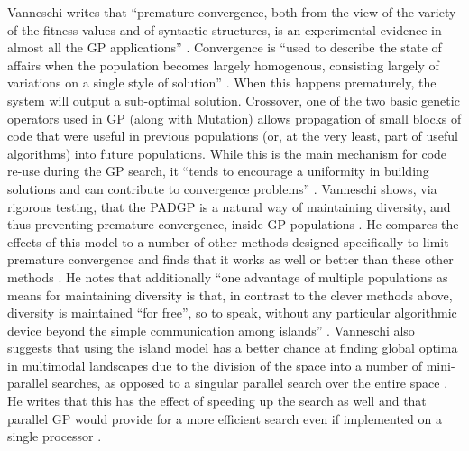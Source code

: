 \documentclass[a4paper,12pt]{report} 	%
\numberwithin{figure}{chapter}
\numberwithin{table}{chapter}
\numberwithin{equation}{chapter}
\begin{document}
\begin{flushleft}
Vanneschi writes that ``premature convergence, both from the view of the variety of the fitness values and of syntactic structures, is an experimental evidence in almost all the GP applications'' \cite[p. 15]{Vanneschi:2004le}. Convergence is ``used to describe the state of affairs when the population becomes largely homogenous, consisting largely of variations on a single style of solution'' \cite[p. 26]{Vanneschi:2004le}. When this happens prematurely, the system will output a sub-optimal solution. Crossover, one of the two basic genetic operators used in GP (along with Mutation) allows propagation of small blocks of code that were useful in previous populations (or, at the very least, part of useful algorithms) into future populations. While this is the main mechanism for code re-use during the GP search, it ``tends to encourage a uniformity in building solutions and can contribute to convergence problems'' \cite[p. 30]{Wehn:1998bh}. Vanneschi shows, via rigorous testing, that the PADGP is a natural way of maintaining diversity, and thus preventing premature convergence, inside GP populations \cite[p. 213]{Vanneschi:2004le}. He compares the effects of this model to a number of other methods designed specifically to limit premature convergence and finds that it works as well or better than these other methods \cite[p. 221]{Vanneschi:2004le}. He notes that additionally ``one advantage of multiple populations as means for maintaining diversity is that, in contrast to the clever methods above, diversity is maintained ``for free'', so to speak, without any particular algorithmic device beyond the simple communication among islands'' \cite[p. 213]{Vanneschi:2004le}. Vanneschi also suggests that using the island model has a better chance at finding global optima in multimodal landscapes due to the division of the space into a number of mini-parallel searches, as opposed to a singular parallel search over the entire space \cite[p. 192]{Vanneschi:2004le}. He writes that this has the effect of speeding up the search as well and that parallel GP would provide for a more efficient search even if implemented on a single processor \cite[p. 230]{Vanneschi:2004le}.


\end{flushleft}
\end{document}
